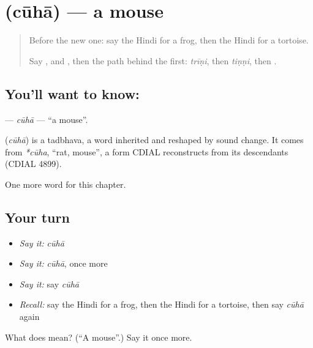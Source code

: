 \section[\texorpdfstring{\hi{चूहा} (cūhā)}{चूहा (cūhā)}]{ (cūhā) — a mouse}

\label{lesson:HI-C149-cuha}



\begin{quote}
Before the new one: say the Hindi for a frog, then the Hindi for a tortoise.

Say \textbf{}, \textbf{} and \textbf{}, then the path behind the first: \emph{trīṇi}, then \emph{tiṇṇi}, then \textbf{}.
\end{quote}

\subsection*{You'll want to know: }
\textbf{} — \emph{cūhā} — \textquotedblleft{}a mouse\textquotedblright{}.

\begin{cousinweb}
\textbf{} (\emph{cūhā}) is a tadbhava, a word inherited and reshaped by sound change. It comes from \emph{*cūha}, \textquotedblleft{}rat, mouse\textquotedblright{}, a form CDIAL reconstructs from its descendants (CDIAL 4899).
\end{cousinweb}

\begin{grammarlens}[title={What you've built}]
One more word for this chapter.
\end{grammarlens}

\subsection*{Your turn}
\begin{itemize}
\raggedright
  \item \emph{Say it:} \emph{cūhā}
  \item \emph{Say it:} \emph{cūhā}, once more
  \item \emph{Say it:} say \emph{cūhā}
  \item \emph{Recall:} say the Hindi for a frog, then the Hindi for a tortoise, then say \emph{cūhā} again
\end{itemize}

\begin{tcolorbox}[breakable,colback=teal!4,colframe=teal!35!black,title={Before you move on}]
What does  mean? (\textquotedblleft{}A mouse\textquotedblright{}.) Say it once more.
\end{tcolorbox}

